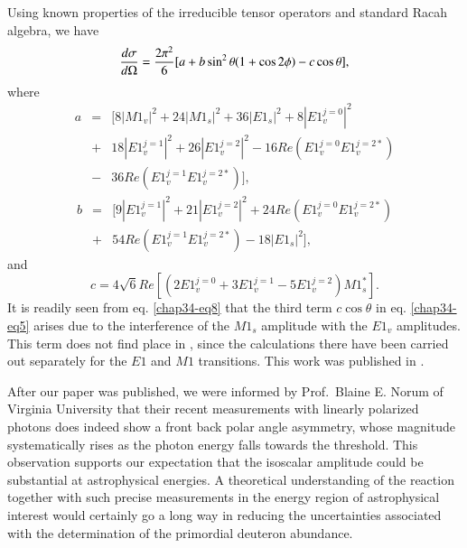 Using known properties \cite{chap34-key52} of the irreducible tensor operators and
standard Racah algebra, we have
\begin{equation}
{d\sigma \over d\Omega}={2\pi^2 \over 6} [a+b \sin^2\theta (1+\cos 2\phi) -c\cos\theta],\label{chap34-eq5}
\end{equation}
where 
\begin{eqnarray}
a &=& \big[ 8 |M1_v|^2+ 24|M1_s|^2 + 36|E1_s|^2 + 8 |E1_v^{j=0}|^2 \nonumber \\ 
	&+&18 |E1_v^{j=1}|^2 + 26 |E1_v^{j=2}|^2 -16 Re(E1_v^{j=0} E1_v^{j=2*}) \nonumber \\ 
	&-&36 Re(E1_v^{j=1} E1_v^{j=2*}) \big], \label{chap34-eq6}
\end{eqnarray}
\begin{eqnarray}
 b &=& \big[ 9 |E1_v^{j=1}|^2+21 |E1_v^{j=2}|^2 +24 Re(E1_v^{j=0} E1_v^{j=2*}) \nonumber \\
&+&54 Re(E1_v^{j=1} E1_v^{j=2*})-18|E1_s|^2 \big], \label{chap34-eq7}
\end{eqnarray}
and
\begin{equation}
c = 4\sqrt 6 Re \left[(2 E1_v^{j=0} + 3 E1_v^{j=1} -5 E1_v^{j=2})M1_s^*\right] \label{chap34-eq8}.
\end{equation}
It is readily seen from  eq. \eqref{chap34-eq8} that the third term $c \cos\theta$ in eq. \eqref{chap34-eq5} arises due to the interference of the $M1_s$ amplitude with the $E1_v$ amplitudes. This term does not find place in \cite{chap34-key49}, since the calculations there have been carried out separately for the $E1$ and $M1$ transitions.  This work was published in \cite{chap34-key54}.

After our paper was published, we were informed \cite{chap34-key55} by Prof.\ Blaine E. Norum of Virginia University that their recent measurements \cite{chap34-key56} with linearly polarized photons does indeed show a front back polar angle asymmetry, whose magnitude systematically rises as the photon energy falls towards the threshold. This observation supports our expectation that the isoscalar amplitude could be substantial at astrophysical energies. A theoretical understanding of the reaction together with such precise measurements in  the energy region of astrophysical interest  would certainly go a long way in reducing the uncertainties associated with the determination of the primordial deuteron abundance. 

